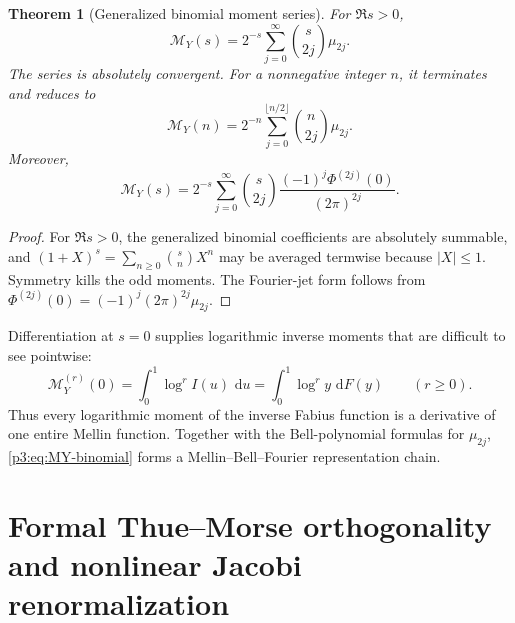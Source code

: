 \documentclass[11pt,oneside]{article}
\newtheorem{theorem}{Theorem}[section]
\theoremstyle{definition}
\newcommand{\dd}{\,\mathrm d}
\begin{document}
\begin{theorem}[Generalized binomial moment series]
\label{p3:thm:mellin-binomial}
For \(\Re s>0\),
\begin{equation}
\boxed{
 \mathcal M_Y(s)
 =2^{-s}\sum_{j=0}^{\infty}\binom{s}{2j}\mu_{2j}.}         \label{p3:eq:MY-binomial}
\end{equation}
The series is absolutely convergent.  For a nonnegative integer \(n\), it terminates and
reduces to
\begin{equation}
 \mathcal M_Y(n)=2^{-n}
 \sum_{j=0}^{\lfloor n/2\rfloor}\binom n{2j}\mu_{2j}.      \label{p3:eq:MY-integer}
\end{equation}
Moreover,
\begin{equation}
 \mathcal M_Y(s)
 =2^{-s}\sum_{j=0}^{\infty}\binom{s}{2j}
 \frac{(-1)^j\Phi^{(2j)}(0)}{(2\pi)^{2j}}.                 \label{p3:eq:MY-Fourier-jet}
\end{equation}
\end{theorem}

\begin{proof}
For \(\Re s>0\), the generalized binomial coefficients are absolutely summable, and
\((1+X)^s=\sum_{n\ge0}\binom{s}{n}X^n\) may be averaged termwise because
\(|X|\le1\).  Symmetry kills the odd moments.  The Fourier-jet form follows from
\(\Phi^{(2j)}(0)=(-1)^j(2\pi)^{2j}\mu_{2j}\).
\end{proof}

Differentiation at \(s=0\) supplies logarithmic inverse moments that are difficult to see
pointwise:
\begin{equation}
 \mathcal M_Y^{(r)}(0)
 =\int_0^1\log^r I(u)\,\dd u
 =\int_0^1\log^r y\,\dd F(y)\qquad(r\ge0).                 \label{p3:eq:inverse-log-moments}
\end{equation}
Thus every logarithmic moment of the inverse Fabius function is a derivative of one entire
Mellin function.  Together with the Bell-polynomial formulas for \(\mu_{2j}\),
\eqref{p3:eq:MY-binomial} forms a Mellin--Bell--Fourier representation chain.

\section{Formal Thue--Morse orthogonality and nonlinear Jacobi renormalization}
\label{p3:sec:tm-formal-jacobi}
\end{document}
